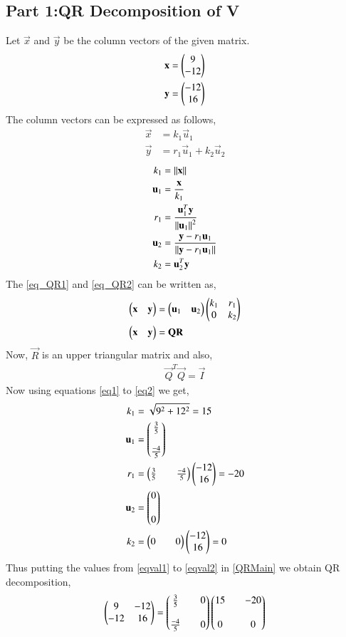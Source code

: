\documentclass[journal,12pt,twocolumn]{IEEEtran}
\begin{document}
\subsection{Part 1:QR Decomposition of V}
Let $\vec{x}$ and $\vec{y}$ be the column vectors of the given matrix.
\begin{align}
    \mathbf{x} &= \begin{pmatrix}9 \\-12 \end{pmatrix}\\
    \mathbf{y} &= \begin{pmatrix}-12 \\ 16\end{pmatrix}
\end{align}
The column vectors can be expressed as follows,
\begin{align}
    \vec{x} &= k_1\vec{u}_1\label{eq_QR1}\\
    \vec{y} &= r_1\vec{u}_1+k_2\vec{u}_2\label{eq_QR2}
\end{align}
\begin{align}
    k_1 &= \left\lVert\mathbf{x}\right\rVert\label{eq1}\\
    \mathbf{u}_1 &= \frac{\mathbf{x}}{k_1}\\
    r_1 &= \frac{\mathbf{u}_1^T\mathbf{y}}{\left\lVert\mathbf{u}_1\right\rVert^2}\\
    \mathbf{u}_2 &= \frac{\mathbf{y} - r_1 \mathbf{u}_1}{\left\lVert\mathbf{y} - r_1 \mathbf{u}_1\right\rVert}\\
    k_2 &= {\mathbf{u}_2^T\mathbf{y}}\label{eq2}
\end{align}
The \eqref{eq_QR1} and \eqref{eq_QR2} can be written as, 
\begin{align}
\begin{pmatrix}\mathbf{x} & \mathbf{y}\end{pmatrix} &= \begin{pmatrix}\mathbf{u}_1 & \mathbf{u}_2\end{pmatrix}\begin{pmatrix}k_1 & r_1 \\ 0 & k_2\end{pmatrix}\label{QRMain}\\
\begin{pmatrix}\mathbf{x} & \mathbf{y}\end{pmatrix} &= \mathbf{Q}\mathbf{R}
\end{align}
Now, $\vec{R}$ is an upper triangular matrix and also,
\begin{align}
\vec{Q}^T\vec{Q}=\vec{I}
\end{align}
Now using equations \eqref{eq1} to \eqref{eq2} we get, 
\begin{align}
    k_1 &= \sqrt{9^2+12^2} = 15\label{eqval1}\\ 
    \mathbf{u}_1 &= \begin{pmatrix}\frac{3}{5}\\ \\ \frac{-4}{5}\end{pmatrix} \\
    r_1 &= \begin{pmatrix}\frac{3}{5}&&\frac{-4}{5}\end{pmatrix}\begin{pmatrix}-12 \\ 16\end{pmatrix} = -20\\ 
    \mathbf{u}_2 &= \begin{pmatrix}0 \\\\ 0\end{pmatrix} \\
    k_2 &= \begin{pmatrix}0&&0\end{pmatrix}\begin{pmatrix}-12\\16\end{pmatrix} = 0\label{eqval2} 
\end{align}
Thus putting the values from \eqref{eqval1} to \eqref{eqval2} in \eqref{QRMain} we obtain QR decomposition,
\begin{align}
    \begin{pmatrix}9 & -12\\ -12 & 16\end{pmatrix} =\begin{pmatrix}\frac{3}{5}&&0\\\\\frac{-4}{5}&&0\end{pmatrix}\begin{pmatrix}15 && -20\\\\0&&0\end{pmatrix}
\end{align}
\end{document}
